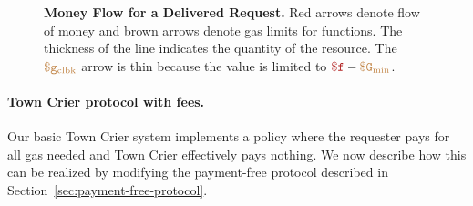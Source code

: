 \begin{figure}
\caption{{\bf Money Flow for a Delivered Request.}
Red arrows denote flow of money and brown arrows denote gas limits for functions.
The thickness of the line indicates the quantity of the resource.
The $\tt {\color{brown} \$g_\text{clbk} }$ arrow is thin because the value is limited to $\fee - \constgasmin$.
}
\label{fig:money-flow}
\end{figure}



\paragraph{Town Crier protocol with fees.}
Our basic Town Crier system implements a policy where the requester pays for all gas needed and Town Crier effectively pays nothing.
We now describe how this can be realized by modifying the payment-free protocol described in Section~\ref{sec:payment-free-protocol}.

